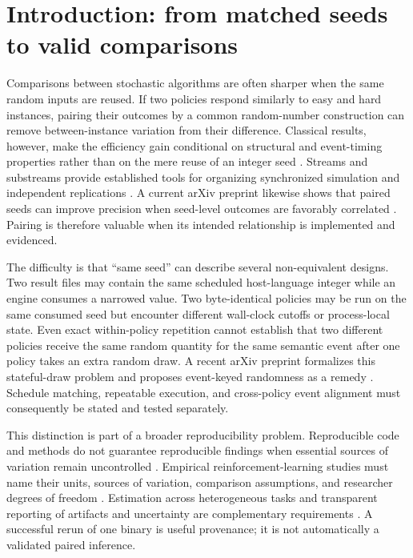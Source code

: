 \documentclass[aps,reprint,superscriptaddress,longbibliography,floatfix]{revtex4-2}
\begin{document}
\section{Introduction: from matched seeds to valid comparisons}

Comparisons between stochastic algorithms are often sharper when the same
random inputs are reused.  If two policies respond similarly to easy and hard
instances, pairing their outcomes by a common random-number construction can
remove between-instance variation from their difference.  Classical results,
however, make the efficiency gain conditional on structural and event-timing
properties rather than on the mere reuse of an integer seed
\cite{glasserman1992crn}.  Streams and substreams provide established tools for
organizing synchronized simulation and independent replications
\cite{lecuyer2002streams}.  A current arXiv preprint likewise shows that paired
seeds can improve precision when seed-level outcomes are favorably correlated
\cite{sharma2025pairedseeds}.  Pairing is therefore valuable when its intended
relationship is implemented and evidenced.

The difficulty is that ``same seed'' can describe several non-equivalent
designs.  Two result files may contain the same scheduled host-language integer
while an engine consumes a narrowed value.  Two byte-identical policies may be
run on the same consumed seed but encounter different wall-clock cutoffs or
process-local state.  Even exact within-policy repetition cannot establish that
two different policies receive the same random quantity for the same semantic
event after one policy takes an extra random draw.  A recent arXiv preprint
formalizes this stateful-draw problem and proposes event-keyed randomness as a
remedy \cite{buffalo2026eventkeyed}.  Schedule matching, repeatable execution,
and cross-policy event alignment must consequently be stated and tested
separately.

This distinction is part of a broader reproducibility problem.  Reproducible
code and methods do not guarantee reproducible findings when essential sources
of variation remain uncontrolled \cite{bouthillier2019reproducible}.  Empirical
reinforcement-learning studies must name their units, sources of variation,
comparison assumptions, and researcher degrees of freedom
\cite{patterson2024empirical}.  Estimation across heterogeneous tasks and
transparent reporting of artifacts and uncertainty are complementary
requirements \cite{agarwal2021statistical,pineau2021reproducibility}.  A
successful rerun of one binary is useful provenance; it is not automatically a
validated paired inference.
\end{document}
